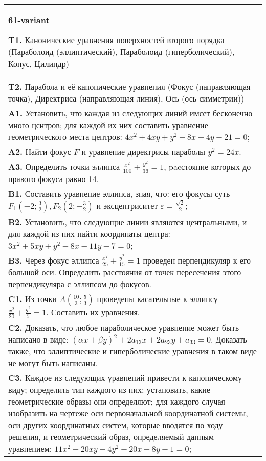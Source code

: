\documentclass{article}
\begin{document}
\begin{tabular}{m{17cm}}
\textbf{61-variant}
\newline

\textbf{T1.} Канонические уравнения поверхностей второго порядка (Параболоид (эллиптический), Параболоид (гиперболический), Конус, Цилиндр) \\
\textbf{T2.} Парабола и её канонические уравнения (Фокус (направляющая точка), Директриса (направляющая линия), Ось (ось симметрии)) \\
\textbf{A1.} Установить, что каждая из следующих линий имєет бесконечно много цєнтров; для каждой их них составить уравнение геометрического места центров: $4 x^2+4 x y+y^2-8 x-4 y-21=0$; \\
\textbf{A2.} Найти фокус $F$ и уравнение директрисы параболы $y^2=24 x$. \\
\textbf{A3.} Определить точки эллипса $\frac{x^2}{100}+\frac{y^2}{36}=1$, pacстояние которых до правого фокуса равно 14. \\
\textbf{B1.} Составить уравнение эллипса, зная, что: его фокусы суть $F_1\left(-2 ; \frac{3}{2}\right), F_2\left(2 ;-\frac{3}{2}\right)$ и эксцентриситет $\varepsilon=\frac{\sqrt{2}}{2}$; \\
\textbf{B2.} Установить, что следующие линии являются центральными, и для каждой из них найти координаты центра: $3 x^2+5 x y+y^2-8 x-11 y-7=0$; \\
\textbf{B3.} Через фокус эллипса $\frac{x^2}{25}+\frac{y^2}{15}=1$ проведен перпендикуляр к его большой оси. Определить расстояния от точек пересечения этого перпендикуляра с эллипсом до фокусов. \\
\textbf{C1.} Из точки $A\left(\frac{10}{3} ; \frac{5}{3}\right)$ проведены касательные к эллипсу $\frac{x^2}{20}+\frac{y^2}{5}=1$. Составить их уравнения. \\
\textbf{C2.} Доказать, что любое параболическое уравнение может быть написано в виде: $ (\alpha x+\beta y) ^2+2a_{13}x+2a_{23}y+a_{33}=0$. Доказать также, что эллиптические и гиперболические уравнения в таком виде не могут быть написаны. \\
\textbf{C3.} Каждое из следующих уравнений привести к каноническому виду; определить тип каждого из них; установить, какие геометрические образы они определяют; для каждого случая изобразить на чертеже оси первоначальной координатной системы, оси других координатных систем, которые вводятся по ходу решения, и геометрический образ, определяемый данным уравнением: $11 x^2-20 x y-4 y^2-20 x-8 y+1=0$; \\

\end{tabular}
\vspace{1cm}
\end{document}
